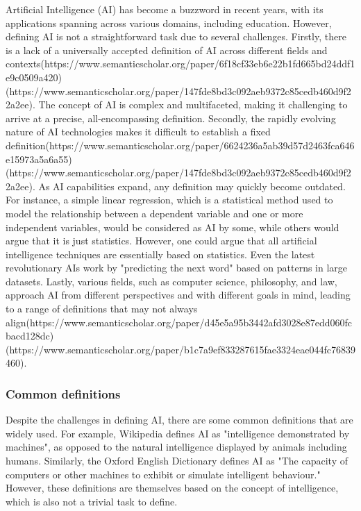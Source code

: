 \documentclass{article}
\begin{document}
Artificial Intelligence (AI) has become a buzzword in recent years, with its
applications spanning across various domains, including education. However,
defining AI is not a straightforward task due to several challenges. Firstly,
there is a lack of a universally accepted definition of AI across different
fields and contexts(https://www.semanticscholar.org/paper/6f18cf33eb6e22b1fd665bd24ddf1e9c0509a420)(https://www.semanticscholar.org/paper/147fde8bd3c092aeb9372c85cedb460d9f22a2ee).
The concept of AI is complex and multifaceted, making it challenging to arrive
at a precise, all-encompassing definition. Secondly, the rapidly evolving
nature of AI technologies makes it difficult to establish a fixed
definition(https://www.semanticscholar.org/paper/6624236a5ab39d57d2463fca646e15973a5a6a55)
(https://www.semanticscholar.org/paper/147fde8bd3c092aeb9372c85cedb460d9f22a2ee).
As AI capabilities expand, any definition may quickly become outdated.
For instance, a simple linear regression, which is a statistical method used
to model the relationship between a dependent variable and one or more
independent variables, would be considered as AI by some, while others
would argue that it is just statistics. However, one could argue that all
artificial intelligence techniques are essentially based on statistics.
Even the latest revolutionary AIs work by "predicting the next word" based
on patterns in large datasets. Lastly, various fields, such as computer
science, philosophy, and law, approach AI from different perspectives and
with different goals in mind, leading to a range of definitions that may
not always align(https://www.semanticscholar.org/paper/d45e5a95b3442afd3028e87edd060fcbacd128dc)
(https://www.semanticscholar.org/paper/b1c7a9ef833287615fae3324eae044fc76839460).

\subsubsection{Common definitions}

Despite the challenges in defining AI, there are some common definitions
that are widely used. For example, Wikipedia defines AI as "intelligence
demonstrated by machines", as opposed to the natural intelligence displayed
by animals including humans. Similarly, the Oxford English Dictionary
defines AI as "The capacity of computers or other machines to exhibit or
simulate intelligent behaviour." However, these definitions are themselves
based on the concept of intelligence, which is also not a trivial task to
define.
\end{document}
